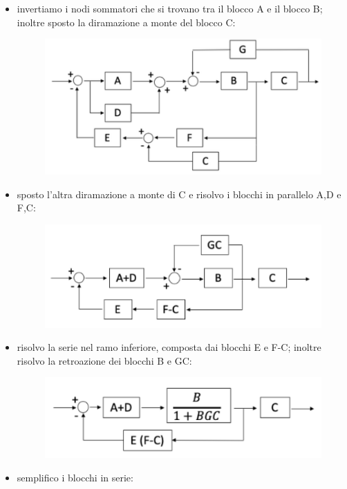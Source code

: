 \documentclass[12pt,a4paper]{article}
\begin{document}
	\begin{itemize}
		\item invertiamo i nodi sommatori che si trovano tra il blocco A e il blocco B; inoltre sposto la diramazione a monte del blocco C:
		\begin{figure}[h!]
			\centering
			\includegraphics[scale=0.4]{./images/schema27_1.png}
		\end{figure}
		\item sposto l'altra diramazione a monte di C e risolvo i blocchi in parallelo A,D e F,C:
		\begin{figure}[h!]
			\centering
			\includegraphics[scale=0.4]{./images/schema27_2.png}
		\end{figure}
		\item risolvo la serie nel ramo inferiore, composta dai blocchi E e F-C; inoltre risolvo la retroazione dei blocchi B e GC:
		\newpage
		\begin{figure}[h!]
			\centering
			\includegraphics[scale=0.4]{./images/schema27_3.png}
		\end{figure}
		\item semplifico i blocchi in serie:

\end{itemize}
\end{document}
